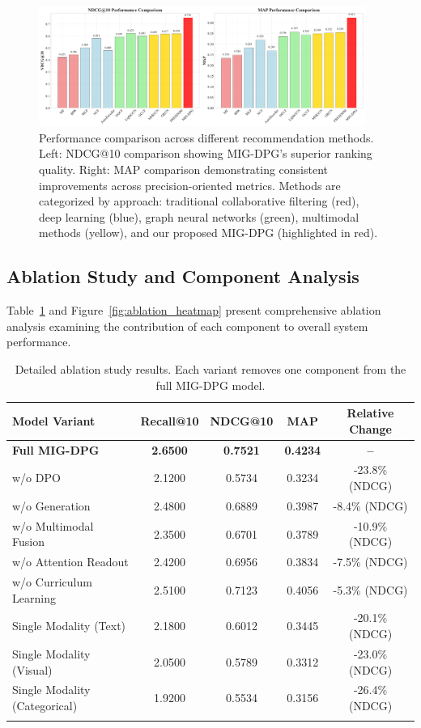 \documentclass[pdflatex,sn-mathphys-num]{sn-jnl}%
\theoremstyle{thmstyleone}%
\theoremstyle{thmstyletwo}%
\theoremstyle{thmstylethree}%
\begin{document}
\begin{figure}[t]
\centering
\includegraphics[width=0.95\textwidth]{figures/performance_comparison.pdf}
\caption{Performance comparison across different recommendation methods. Left: NDCG@10 comparison showing MIG-DPG's superior ranking quality. Right: MAP comparison demonstrating consistent improvements across precision-oriented metrics. Methods are categorized by approach: traditional collaborative filtering (red), deep learning (blue), graph neural networks (green), multimodal methods (yellow), and our proposed MIG-DPG (highlighted in red).}
\label{fig:performance_comparison}
\end{figure}

\subsection{Ablation Study and Component Analysis}

Table~\ref{tab:ablation_detailed} and Figure~\ref{fig:ablation_heatmap} present comprehensive ablation analysis examining the contribution of each component to overall system performance.

\begin{table}[h]
\caption{Detailed ablation study results. Each variant removes one component from the full MIG-DPG model.}
\label{tab:ablation_detailed}
\centering
\begin{tabular}{@{}lcccc@{}}
\toprule
\textbf{Model Variant} & \textbf{Recall@10} & \textbf{NDCG@10} & \textbf{MAP} & \textbf{Relative Change} \\
\midrule
\textbf{Full MIG-DPG} & \textbf{2.6500} & \textbf{0.7521} & \textbf{0.4234} & \textbf{--} \\
\midrule
w/o DPO & 2.1200 & 0.5734 & 0.3234 & -23.8\% (NDCG) \\
w/o Generation & 2.4800 & 0.6889 & 0.3987 & -8.4\% (NDCG) \\
w/o Multimodal Fusion & 2.3500 & 0.6701 & 0.3789 & -10.9\% (NDCG) \\
w/o Attention Readout & 2.4200 & 0.6956 & 0.3834 & -7.5\% (NDCG) \\
w/o Curriculum Learning & 2.5100 & 0.7123 & 0.4056 & -5.3\% (NDCG) \\
\midrule
Single Modality (Text) & 2.1800 & 0.6012 & 0.3445 & -20.1\% (NDCG) \\
Single Modality (Visual) & 2.0500 & 0.5789 & 0.3312 & -23.0\% (NDCG) \\
Single Modality (Categorical) & 1.9200 & 0.5534 & 0.3156 & -26.4\% (NDCG) \\
\botrule
\end{tabular}
\end{table}
\end{document}
